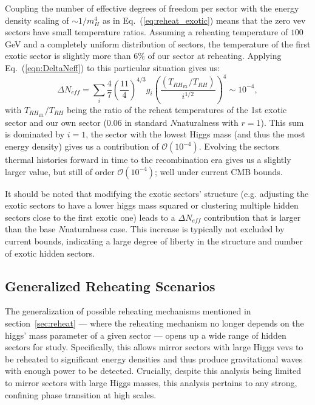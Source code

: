 \documentclass[nofootinbib,twocolumn,preprintnumbers]{revtex4-1}
\begin{document}
Coupling the number of effective degrees of freedom per sector with the energy density scaling of $\sim 1/m_H^4$ as in Eq.~(\ref{eq:reheat_exotic}) means that the zero vev sectors have small temperature ratios. Assuming a reheating temperature of $100$ GeV and a completely uniform distribution of sectors, the temperature of the first exotic sector is slightly more than $6\%$ of our sector at reheating. Applying Eq.~(\ref{eqn:DeltaNeff}) to this particular situation gives us:
\begin{equation}
\Delta N_{eff} = \sum_i \frac{4}{7}\left(\frac{11}{4}\right)^{4/3}g_{i} \left(\frac{(T_{RH_{E1}}/T_{RH})}{i^{1/2}}\right)^4 \sim 10^{-4},
\end{equation}     
with $T_{RH_{E1}}/T_{RH}$ being the ratio of the reheat temperatures of the 1st exotic sector and our own sector ($0.06$ in standard $N$naturalness with $r = 1$).  This sum is dominated by $i=1$, the sector with the lowest Higgs mass (and thus the most energy density) gives us a contribution of $\mathcal{O} (10^{-4})$. Evolving the sectors thermal histories forward in time to the recombination era gives us a slightly larger value, but still of order $\mathcal{O}(10^{-4})$; well under current CMB bounds. 

It should be noted that modifying the exotic sectors' structure (e.g. adjusting the exotic sectors to have a lower higgs mass squared or clustering multiple hidden sectors close to the first exotic one) leads to a $\Delta N_{eff}$ contribution that is larger than the base $N$naturalness case. This increase is typically not excluded by current bounds, indicating a large degree of liberty in the structure and number of exotic hidden sectors.

\subsection{Generalized Reheating Scenarios}

The generalization of possible reheating mechanisms mentioned in section~\ref{sec:reheat} --- where the reheating mechanism no longer depends on the higgs' mass parameter of a given sector --- opens up a wide range of hidden sectors for study. Specifically, this allows mirror sectors with large Higgs vevs to be reheated to significant energy densities and thus produce gravitational waves with enough power to be detected. Crucially, despite this analysis being limited to mirror sectors with large Higgs masses, this analysis pertains to any strong, confining phase transition at high scales.
\end{document}
